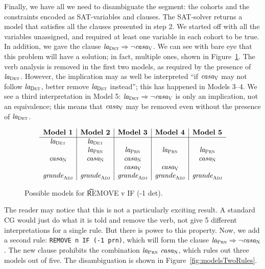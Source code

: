 
Finally, we have all we need to disambiguate the segment: the cohorts and the constraints encoded as SAT-variables and clauses. The SAT-solver returns a model that satisfies all the clauses presented in step 2.
We started off with all the variables unassigned, and required at least one variable 
in each cohort to be true. In addition, we gave the clause $\text{\em la}_{\text{\sc Det}} \Rightarrow \neg \text{\em casa}_{\text{\sc V}}$.
We can see with bare eye that this problem will have a solution; in fact, multiple ones, 
shown in Figure~\ref{fig:modelsOneRule}.
The verb analysis is removed in the first two models, as required by the presence of $\text{\em la}_{\text{\sc Det}}$. However, the implication may as well be interpreted ``if $\text{\em casa}_{\text{\sc V}}$ may not follow $\text{\em la}_{\text{\sc Det}}$, better remove $\text{\em la}_{\text{\sc Det}}$ instead''; this has happened in Models 3--4. 
We see a third interpretation in Model 5: $\text{\em la}_{\text{\sc Det}} \Rightarrow \neg \text{\em casa}_{\text{\sc V}}$ is only an 
implication, not an equivalence; this means that $\text{\em casa}_{\text{\sc V}}$ may be removed even without 
the presence of $\text{\em la}_{\text{\sc Det}}$. 

\begin{figure}[h]
\centering
$$\begin{array}{ c | c | c | c | c}
\textbf{Model 1}  & \textbf{Model 2}  & \textbf{Model 3} & \textbf{Model 4} & \textbf{Model 5} \\ \hline
 \laDet   &  \laDet  &         &        &        \\
          &  \laPrn  & \laPrn  & \laPrn & \laPrn \\
 \casaN   &  \casaN  & \casaN  &        & \casaN \\
          &          & \casaV  & \casaV &         \\
\grandeAdj & \grandeAdj & \grandeAdj & \grandeAdj & \grandeAdj \\

\end{array}$$
\caption{Possible models for \t{REMOVE v IF (-1 det)}.}
\label{fig:modelsOneRule}
\end{figure}

The reader may notice that this is not a particularly exciting result. A standard CG would just do what it is told and remove the verb, not give 5 different interpretations for a single rule.
But there is power to this property. Now, we add a second rule: \texttt{REMOVE n IF (-1 prn)}, which will form the clause $\text{\em la}_{\text{\sc Prn}} \Rightarrow \neg \text{\em casa}_{\text{\sc N}}$. The new clause
prohibits the combination $\laPrn \ \casaN$, which rules out three models out of five. The disambiguation is shown in Figure~\ref{fig:modelsTwoRules}.

